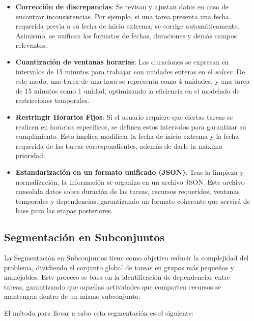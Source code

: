 \documentclass{article}
\begin{document}
\begin{itemize}
    \item \textbf{Corrección de discrepancias}: Se revisan y ajustan datos en caso de encontrar inconsistencias. Por ejemplo, si una tarea presenta una fecha requerida previa a su fecha de inicio extrema, se corrige automáticamente. Asimismo, se unifican los formatos de fechas, duraciones y demás campos relevantes.

    \item \textbf{Cuantización de ventanas horarias}: Las duraciones se expresan en intervalos de 15 minutos para trabajar con unidades enteras en el \textit{solver}. De este modo, una tarea de una hora se representa como 4 unidades, y una tarea de 15 minutos como 1 unidad, optimizando la eficiencia en el modelado de restricciones temporales.
    
    \item \textbf{Restringir Horarios Fijos}: Si el usuario requiere que ciertas tareas se realicen en horarios específicos, se definen estos intervalos para garantizar su cumplimiento. Esto implica modificar la fecha de inicio extrema y la fecha requerida de las tareas correspondientes, además de darle la máxima prioridad.

    \item \textbf{Estandarización en un formato unificado (JSON)}: Tras la limpieza y normalización, la información se organiza en un archivo JSON. Este archivo consolida datos sobre duración de las tareas, recursos requeridos, ventanas temporales y dependencias, garantizando un formato coherente que servirá de base para las etapas posteriores.

\end{itemize}



\subsection{Segmentación en Subconjuntos}

La Segmentación en Subconjuntos tiene como objetivo reducir la complejidad del problema, dividiendo el conjunto global de tareas en grupos más pequeños y manejables. Este proceso se basa en la identificación de dependencias entre tareas, garantizando que aquellas actividades que comparten recursos se mantengan dentro de un mismo subconjunto.

El método para llevar a cabo esta segmentación es el siguiente:
\end{document}
